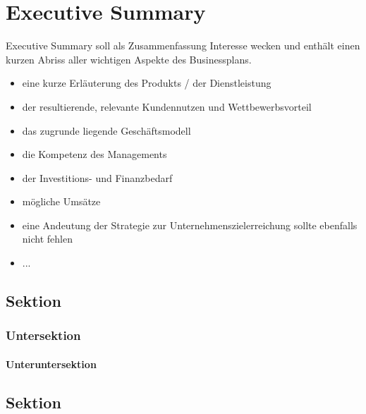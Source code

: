 \chapter{Executive Summary}

Executive Summary soll als Zusammenfassung Interesse wecken und enthält einen kurzen Abriss aller wichtigen Aspekte des Businessplans.
\begin{itemize}
\item eine kurze Erläuterung des Produkts / der Dienstleistung
\item der resultierende, relevante Kundennutzen und Wettbewerbsvorteil
\item das zugrunde liegende Geschäftsmodell
\item die Kompetenz des Managements
\item der Investitions- und Finanzbedarf
\item mögliche Umsätze
\item eine Andeutung der Strategie zur Unternehmenszielerreichung sollte ebenfalls nicht fehlen
\item ...
\end{itemize}

\section{Sektion}

\subsection{Untersektion}

\subsubsection{Unteruntersektion}

\section{Sektion}